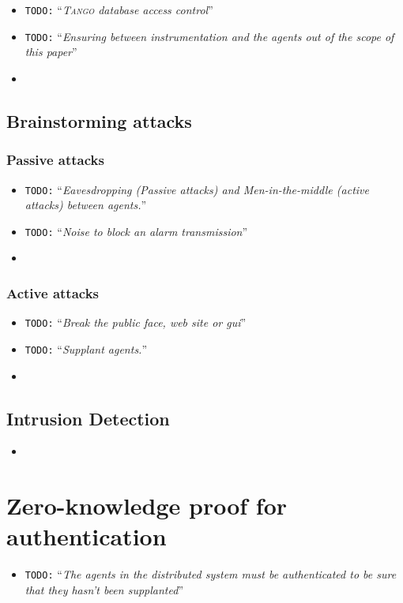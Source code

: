 \documentclass[10pt,a4paper,twoside]{llncs}
\newcommand{\todo}[1]{\texttt{\color{red}TODO:} ``\emph{#1}''}
\newcommand{\tango}{\textsc{Tango} }
\begin{document}
\begin{itemize}
 \item \todo{\tango database access control}
 \item \todo{Ensuring between instrumentation and the agents out of the scope of this paper}
 \item 
\end{itemize}

%
\subsection{Brainstorming attacks}

%
\subsubsection{Passive attacks}

\begin{itemize}
 \item \todo{Eavesdropping (Passive attacks) and Men-in-the-middle (active attacks) between agents.}
 \item \todo{Noise to block an alarm transmission}
 \item 
\end{itemize}

%
\subsubsection{Active attacks}

\begin{itemize}
 \item \todo{Break the public face, web site or gui}
 \item \todo{Supplant agents.}
 \item 
\end{itemize}

%
\subsection{Intrusion Detection}

\begin{itemize}
 \item 
\end{itemize}

%
\section{Zero-knowledge proof for authentication \label{sec:auth}}
\begin{itemize}
 \item \todo{The agents in the distributed system must be authenticated to be sure that they hasn't been supplanted}
\end{itemize}
\end{document}
